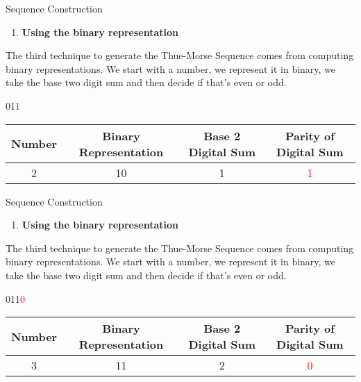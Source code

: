\documentclass{beamer}
\begin{document}
\begin{frame}{Sequence Construction}
    \scriptsize
    \begin{enumerate}[3]
    \item \textbf{\large Using the binary representation}
    \end{enumerate}
    \begin{center}
        \normalsize The third technique to generate the Thue-Morse Sequence comes from computing binary representations. We start with a number, we represent it in binary, we take the base two digit sum and then decide if that's even or odd.
    \end{center}

    \vfill

    \begin{center} 
        01\textcolor{red}{1}
    \end{center}

    \vfill

    \begin{center}
    \begin{tabular}{c|c|c|c|}
   
    \textbf{Number} & \textbf{Binary Representation} & \textbf{Base 2 Digital Sum} & \textbf{Parity of Digital Sum} \\ \hline
    2 & 10 & 1 & \textcolor{red}{1}
    \end{tabular}
    \end{center}

\end{frame}

\begin{frame}{Sequence Construction}
    \scriptsize
    \begin{enumerate}[3]
    \item \textbf{\large Using the binary representation}
    \end{enumerate}
    \begin{center}
        \normalsize The third technique to generate the Thue-Morse Sequence comes from computing binary representations. We start with a number, we represent it in binary, we take the base two digit sum and then decide if that's even or odd.
    \end{center}

    \vfill

    \begin{center} 
        011\textcolor{red}{0}
    \end{center}

    \vfill

    \begin{center}
    \begin{tabular}{c|c|c|c|}
   
    \textbf{Number} & \textbf{Binary Representation} & \textbf{Base 2 Digital Sum} & \textbf{Parity of Digital Sum} \\ \hline
    3 & 11 & 2 & \textcolor{red}{0}
    \end{tabular}
    \end{center}

\end{frame}
\end{document}
